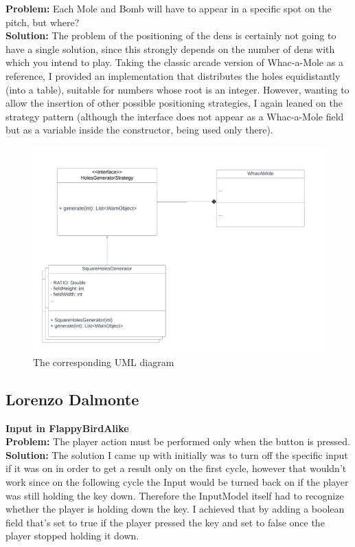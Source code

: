 \documentclass[a4paper,12pt]{report}
\begin{document}
\textbf{Problem:} Each Mole and Bomb will have to appear in a specific spot on the
pitch, but where?  \\
\textbf{Solution:} The problem of the positioning of the dens is certainly not going to have a single solution, since this strongly depends
on the number of dens with which you intend to play. Taking the classic arcade version of Whac-a-Mole as a reference, I provided an
implementation that distributes the holes equidistantly (into a table), suitable for numbers whose root is an integer. However, wanting to
allow the insertion of other possible positioning strategies, I again leaned on the strategy pattern (although the interface does not appear
as a Whac-a-Mole field but as a variable inside the constructor, being used only there).
\begin{figure}[ht]
	\centering
	\includegraphics[width=\textwidth]{res/HolesGenerator.pdf}
	\caption{The corresponding UML diagram}
\end{figure}
\pagebreak

\subsection*{Lorenzo Dalmonte}
\textbf{Input in FlappyBirdAlike}\\
\textbf{Problem:} The player action must be performed only when the button is pressed.\\
\textbf{Solution:} The solution I came up with initially was to turn off the specific input if it was on in order to get a result only on the first cycle,
however that wouldn't work since on the following cycle the Input would be turned back on if the player was still holding the key down.
Therefore the InputModel itself had to recognize whether the player is holding down the key. I achieved that by adding a boolean field that's set to true
if the player pressed the key and set to false once the player stopped holding it down.
\end{document}
